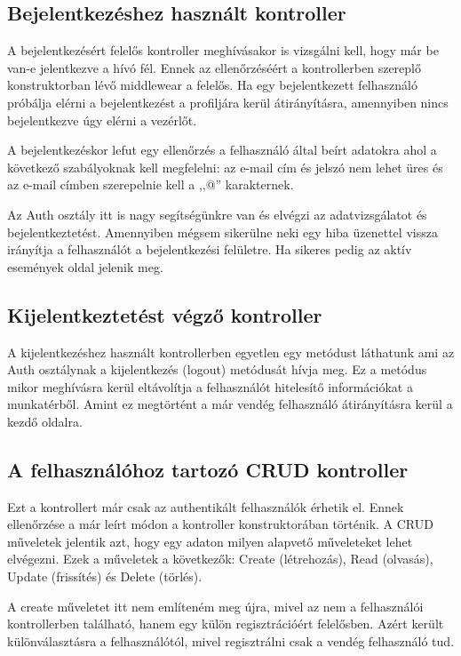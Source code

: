 \documentclass[
]{thesis-ekf}
\theoremstyle{definition}
\theoremstyle{remark}
\begin{document}
\subsection{Bejelentkezéshez használt kontroller}
A bejelentkezésért felelős kontroller meghívásakor is vizsgálni kell, hogy már be van-e jelentkezve a hívó fél. Ennek az ellenőrzéséért a kontrollerben szereplő konstruktorban lévő middlewear a felelős. Ha egy bejelentkezett felhasználó próbálja elérni a bejelentkezést a profiljára kerül átirányításra, amennyiben nincs bejelentkezve úgy elérni a vezérlőt.

A bejelentkezéskor lefut egy ellenőrzés a felhasználó által beírt adatokra ahol a következő szabályoknak kell megfelelni: az e-mail cím és jelszó nem lehet üres és az e-mail címben szerepelnie kell a ,,@'' karakternek.

Az Auth osztály itt is nagy segítségünkre van és elvégzi az adatvizsgálatot és bejelentkeztetést. Amennyiben mégsem sikerülne neki egy hiba üzenettel vissza irányítja a felhasználót a bejelentkezési felületre. Ha sikeres pedig az aktív események oldal jelenik meg.

\subsection{Kijelentkeztetést végző kontroller} 
A kijelentkezéshez használt kontrollerben egyetlen egy metódust láthatunk ami az Auth osztálynak a kijelentkezés (logout) metódusát hívja meg. Ez a metódus mikor meghívásra kerül eltávolítja a felhasználót hitelesítő információkat a munkatérből. Amint ez megtörtént a már vendég felhasználó átirányításra kerül a kezdő oldalra.

\subsection{A felhasználóhoz tartozó CRUD kontroller}
Ezt a kontrollert már csak az authentikált felhasználók érhetik el. Ennek ellenőrzése a már leírt módon a kontroller konstruktorában történik. A CRUD műveletek jelentik azt, hogy egy adaton milyen alapvető műveleteket lehet elvégezni. Ezek a műveletek a következők: Create (létrehozás), Read (olvasás), Update (frissítés) és Delete (törlés). 

A create műveletet itt nem említeném meg újra, mivel az nem a felhasználói kontrollerben található, hanem egy külön regisztrációért felelősben. Azért került különválasztásra a felhasználótól, mivel regisztrálni csak a vendég felhasználó tud. 
\end{document}
